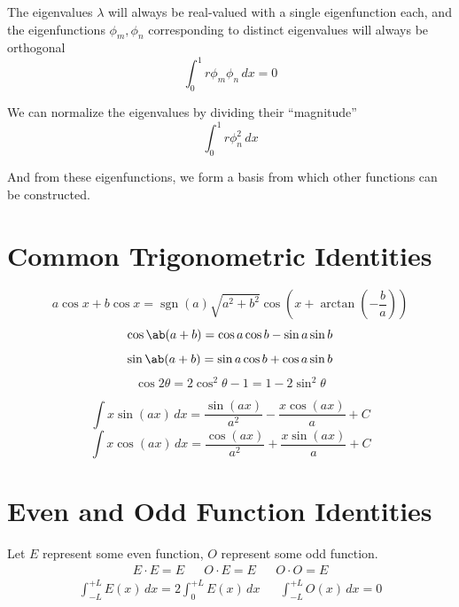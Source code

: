 \documentclass{article}
\DeclareMathOperator{\sgn}{sgn}
\begin{document}
The eigenvalues $\lambda$ will always be real-valued with a single eigenfunction each, and the eigenfunctions $\phi_m,\phi_n$ corresponding to distinct eigenvalues will always be orthogonal
$$\int_0^1 r\phi_m\phi_n\,dx=0$$

We can normalize the eigenvalues by dividing their ``magnitude''
$$\int_0^1r\phi_n^2\,dx$$

And from these eigenfunctions, we form a basis from which other functions can be constructed.

\section{Common Trigonometric Identities}
$$a\cos{x}+b\cos{x}=\sgn{(a)}\sqrt{a^2+b^2}\cos{\left(x+\arctan\left(-\frac{b}{a}\right)\right)}$$
$$\cos{\ab(a+b)} = \cos{a}\cos{b} - \sin{a}\sin{b}$$
$$\sin{\ab(a+b)} = \sin{a}\cos{b} + \cos{a}\sin{b}$$
$$\cos{2\theta} = 2\cos^2\theta-1 =  1 - 2\sin^2\theta$$

$$\int x\sin(ax)\,dx = \frac{\sin(ax)}{a^2}-\frac{x\cos(ax)}{a}+C$$
$$\int x\cos(ax)\,dx = \frac{\cos(ax)}{a^2}+\frac{x\sin(ax)}{a}+C$$

\section{Even and Odd Function Identities}
Let $E$ represent some even function, $O$ represent some odd function.
\begin{align*}
    E \cdot E = E && O \cdot E = E &&
    O \cdot O = E
\end{align*}
\begin{align*}
    \int_{-L}^{+L} E(x)\,dx = 2\int_0^{+L}E(x)\,dx&&
    \int_{-L}^{+L} O(x)\,dx = 0
\end{align*}
\end{document}
